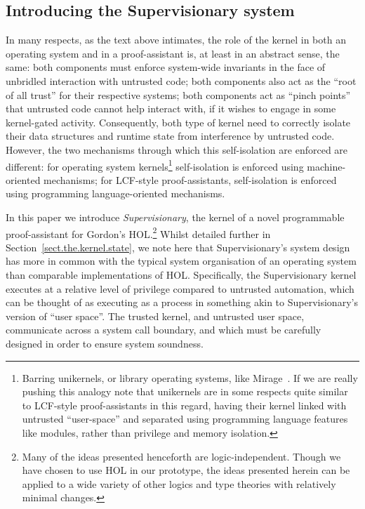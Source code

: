 \documentclass[a4paper, UKenglish, cleveref, autoref, thm-restate, colorlinks]{lipics-v2021}
\begin{document}
\subsection{Introducing the Supervisionary system}

In many respects, as the text above intimates, the role of the kernel in both an operating system and in a proof-assistant is, at least in an abstract sense, the same: both components must enforce system-wide invariants in the face of unbridled interaction with untrusted code; both components also act as the ``root of all trust'' for their respective systems; both components act as ``pinch points'' that untrusted code cannot help interact with, if it wishes to engage in some kernel-gated activity.
Consequently, both type of kernel need to correctly isolate their data structures and runtime state from interference by untrusted code.
However, the two mechanisms through which this self-isolation are enforced are different: for operating system kernels\footnote{Barring unikernels, or library operating systems, like Mirage~\cite{10.1145/2490301.2451167, 10.1145/2451116.2451167}.  If we are really pushing this analogy note that unikernels are in some respects quite similar to LCF-style proof-assistants in this regard, having their kernel linked with untrusted ``user-space'' and separated using programming language features like modules, rather than privilege and memory isolation.} self-isolation is enforced using machine-oriented mechanisms; for LCF-style proof-assistants, self-isolation is enforced using programming language-oriented mechanisms.

In this paper we introduce \emph{Supervisionary}, the kernel of a novel programmable proof-assistant for Gordon's HOL.\footnote{Many of the ideas presented henceforth are logic-independent.  Though we have chosen to use HOL in our prototype, the ideas presented herein can be applied to a wide variety of other logics and type theories with relatively minimal changes.}
Whilst detailed further in Section~\ref{sect.the.kernel.state}, we note here that Supervisionary's system design has more in common with the typical system organisation of an operating system than comparable implementations of HOL.
Specifically, the Supervisionary kernel executes at a relative level of privilege compared to untrusted automation, which can be thought of as executing as a process in something akin to Supervisionary's version of ``user space''.
The trusted kernel, and untrusted user space, communicate across a system call boundary, and which must be carefully designed in order to ensure system soundness.
\end{document}
